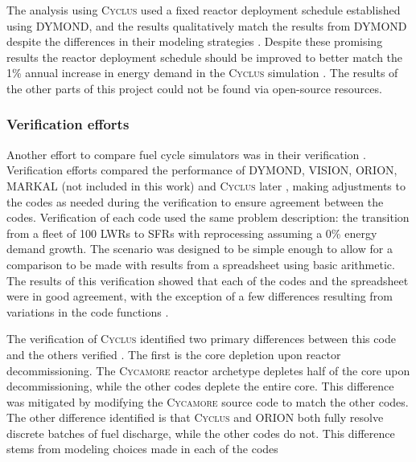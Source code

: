 \documentclass{article}
\newcommand{\Cyclus}{\textsc{Cyclus}\xspace}%
\newcommand{\Cycamore}{\textsc{Cycamore}\xspace}%
\begin{document}
    The analysis using \Cyclus used a fixed reactor deployment schedule established 
    using \gls{DYMOND}, and the results qualitatively match the results from 
    \gls{DYMOND} despite the differences in their modeling strategies 
    \cite{djokic_application_2015}. Despite these promising results the 
    reactor deployment schedule should be improved to better match the 1\% 
    annual increase in energy demand in the \Cyclus simulation
    \cite{djokic_application_2015}. The results of the other parts of 
    this project could not be found via open-source resources. 


\subsubsection{Verification efforts}
    Another effort to compare fuel cycle simulators was in their verification
    \cite{feng_standardized_2016,bae_standardized_2019}. Verification efforts
    compared the performance of DYMOND, VISION, ORION, MARKAL (not included in 
    this work)
    \cite{feng_standardized_2016} and \Cyclus later \cite{bae_standardized_2019}, 
    making adjustments to the codes as needed
    during the verification to ensure agreement between the codes. Verification 
    of each code used the same problem description: the transition from 
    a fleet of 100 \glspl{LWR} to \glspl{SFR} with reprocessing assuming a
    0\% energy demand growth.  
    The scenario was designed to be simple enough to allow for a comparison 
    to be made with results from a spreadsheet using basic arithmetic. The 
    results of this 
    verification showed that each of the codes and the spreadsheet were in 
    good agreement, with the exception of a few differences resulting from 
    variations in the code functions \cite{feng_standardized_2016}.

    The verification of \Cyclus identified two primary differences between 
    this code and the others verified \cite{bae_standardized_2019}. The 
    first is the core depletion upon reactor decommissioning. The \Cycamore
    reactor archetype depletes half of the core upon decommissioning, while the 
    other codes deplete the entire core. This difference was mitigated by 
    modifying the \Cycamore source code to match the other codes. The other 
    difference identified is that \Cyclus and ORION both fully resolve 
    discrete batches of fuel discharge, while the other codes do not. This 
    difference stems from modeling choices made in each of the codes 
\end{document}
